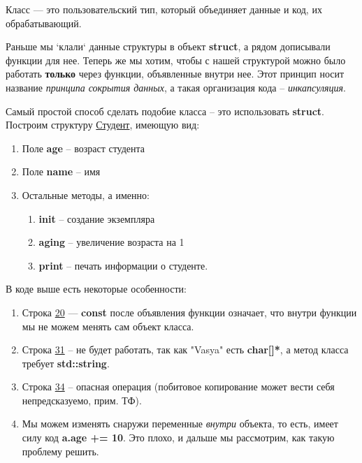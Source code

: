 \begin{lecture}[\lectureSubject]
	\begin{lecSection}[Класс]
		Класс --- это пользовательский тип, который объединяет данные и код, их обрабатывающий.
		
		Раньше мы `клали` данные структуры в объект \textbf{struct}, а рядом дописывали функции для нее. Теперь же мы хотим, чтобы с нашей структурой можно было работать \textbf{только} через функции, объявленные внутри нее. Этот принцип носит название \textit{принципа сокрытия данных}, а такая организация кода -- \textit{инкапсуляция}.
		\end{lecSection}
		
		\begin{lecSection}
		Самый простой способ сделать подобие класса -- это использовать \textbf{struct}. Построим структуру \underline{Студент}, имеющую вид:
		\begin{enumerate}
			\item Поле \textbf{age} -- возраст студента
			\item Поле \textbf{name} -- имя
			\item Остальные методы, а именно:
			\begin{enumerate}
				\item \textbf{init} -- создание экземпляра
				\item \textbf{aging} -- увеличение возраста на 1
				\item \textbf{print} -- печать информации о студенте.
			\end{enumerate}
		\end{enumerate}
		
		\newpage
		В коде выше есть некоторые особенности:
		\begin{enumerate}
			\item Строка \underline{20} --- \textbf{const} после объявления функции означает, что внутри функции мы не можем менять сам объект класса.
			\item Строка \underline{31} -- не будет работать, так как "Vasya" есть \textbf{char[]*}, а метод класса требует \textbf{std::string}.
			\item Строка \underline{34} -- опасная операция (побитовое копирование может вести себя непредсказуемо, прим. ТФ).
			\item Мы можем изменять снаружи переменные \textit{внутри} объекта, то есть, имеет силу код \textbf{a.age += 10}. Это плохо, и дальше мы рассмотрим, как такую проблему решить.
		\end{enumerate}
	\end{lecSection}
	

\end{lecture}
